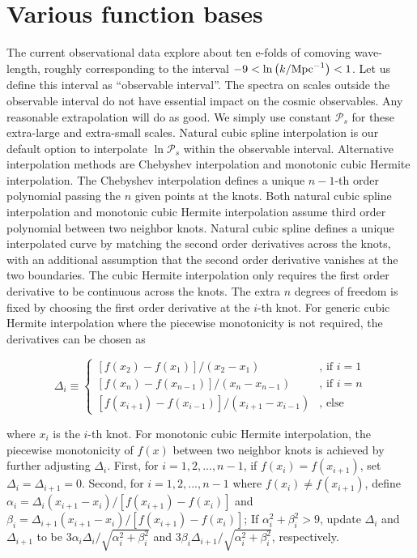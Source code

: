 \documentclass[a4paper,11pt]{article}
\newcommand{\Mpcinv}{{\rm Mpc}^{-1}}
\newcommand{\pscalar}{{\mathcal{P}_s}}
\begin{document}
\appendix
\section{Various function bases}\label{app:polynomials}
The current observational data explore about ten e-folds of comoving
wave-length, roughly corresponding to the interval
$-9<\ln{\left(k/\Mpcinv\right)}<1$. Let us define this interval as
``observable interval''. The spectra on scales outside the observable
interval do not have essential impact on the cosmic observables. Any
reasonable extrapolation will do as good. We simply use constant
$\pscalar$ for these extra-large and extra-small scales. Natural cubic
spline interpolation is our default option to interpolate
$\ln\pscalar$ within the observable interval. Alternative
interpolation methods are Chebyshev interpolation and monotonic cubic
Hermite interpolation. The Chebyshev interpolation defines a unique
$n-1$-th order polynomial passing the $n$ given points at the
knots. Both natural cubic spline interpolation and monotonic cubic
Hermite interpolation assume third order polynomial between two
neighbor knots. Natural cubic spline defines a unique interpolated
curve by matching the second order derivatives across the knots, with
an additional assumption that the second order derivative vanishes at
the two boundaries. The cubic Hermite interpolation only requires the
first order derivative to be continuous across the knots. The extra
$n$ degrees of freedom is fixed by choosing the first order derivative
at the $i$-th knot. For generic cubic Hermite interpolation where the
piecewise monotonicity is not required, the derivatives can be chosen
as

\begin{equation}
\Delta_i \equiv \left\{
\begin{array}{ll}
\left[f(x_{2}) - f(x_{1})\right]/(x_{2}-x_{1}) & \text{, if } i = 1 \\
\left[f(x_{n}) - f(x_{n-1})\right]/(x_{n}-x_{n-1}) & \text{, if } i = n \\
\left[f(x_{i+1}) - f(x_{i-1})\right]/(x_{i+1}-x_{i-1}) & \text{, else}
\end{array}
\right.
\end{equation}

where $x_i$ is the $i$-th knot. For monotonic cubic Hermite
interpolation, the piecewise monotonicity of $f(x)$ between two
neighbor knots is achieved by further adjusting $\Delta_i$. First, for
$i=1,2,...,n-1$, if $f(x_i)=f(x_{i+1})$, set
$\Delta_i=\Delta_{i+1}=0$. Second, for $i=1,2,...,n-1$ where
$f(x_i)\ne f(x_{i+1})$, define
$\alpha_i=\Delta_i(x_{i+1}-x_i)/\left[f(x_{i+1})-f(x_i)\right]$ and
$\beta_i = \Delta_{i+1}(x_{i+1}-x_i)/\left[f(x_{i+1})-f(x_i)\right]$;
If $\alpha_i^2+\beta_i^2>9$, update $\Delta_i$ and $\Delta_{i+1}$ to
be $3\alpha_i\Delta_i/\sqrt{\alpha_i^2+\beta_i^2} $ and
$3\beta_i\Delta_{i+1}/\sqrt{\alpha_i^2+\beta_i^2}$, respectively.
\end{document}
